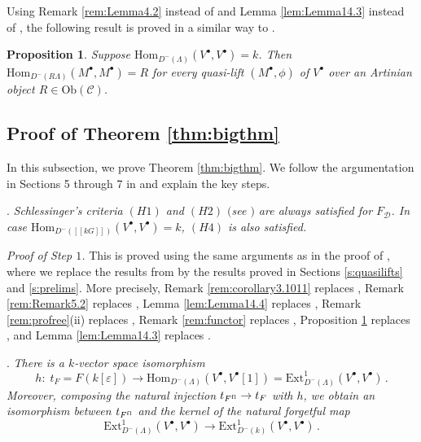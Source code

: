 \documentclass{amsart}
\theoremstyle{plain}
\newtheorem{prop}[thm]{Proposition}
\theoremstyle{definition}
\theoremstyle{remark}
\begin{document}
Using Remark \ref{rem:Lemma4.2} instead of \cite[Lemma 4.2]{bcderived} and
Lemma \ref{lem:Lemma14.3} instead of \cite[Lemma 14.3]{bcderived}, the following result 
is proved in a similar way to
\cite[Prop. 4.3]{bcderived}.

\begin{prop}
\label{prop:liftendos}
Suppose $\mathrm{Hom}_{D^-(\Lambda)}(V^\bullet,V^\bullet)= k$.
Then $\mathrm{Hom}_{D^-(R\Lambda)}(M^\bullet,M^\bullet)= R$
for every quasi-lift $(M^\bullet,\phi)$ of $V^\bullet$ over an Artinian object 
$R\in\mathrm{Ob}(\mathcal{C})$.
\end{prop}

\subsection{Proof of Theorem \ref{thm:bigthm}}
\label{s:proofbigthm}

In this subsection, we prove Theorem \ref{thm:bigthm}. We follow the argumentation in
Sections 5 through 7 in \cite{bcderived} and explain the key steps.

\medskip

. \textit{Schlessinger's criteria $(H1)$ and $(H2)$
$($see \cite[Thm. 2.11]{Sch}$)$
are always satisfied for $F_{\mathcal{D}}$. In case
$\mathrm{Hom}_{D^-([[kG]])}(V^\bullet,V^\bullet)= k$,
$(H4)$ is also satisfied.}

\medskip

\noindent\textit{Proof of Step $1$.} This is proved using the same arguments as in the proof of \cite[Prop. 5.1]{bcderived},
where we replace the results from \cite[Sects. 3, 4 and 14]{bcderived} by the results proved in Sections
\ref{s:quasilifts} and \ref{s:prelims}. More precisely, 
Remark \ref{rem:corollary3.1011} replaces \cite[Cor. 3.10]{bcderived},
Remark \ref{rem:Remark5.2} replaces \cite[Remark 5.2]{bcderived},
Lemma \ref{lem:Lemma14.4} replaces \cite[Lemma 14.4]{bcderived},
Remark \ref{rem:profree}(ii) replaces \cite[Lemma 2.11]{bcderived},
Remark \ref{rem:functor} replaces \cite[Prop. 2.12]{bcderived},
Proposition \ref{prop:liftendos} replaces \cite[Prop. 4.3]{bcderived}, and
Lemma \ref{lem:Lemma14.3} replaces \cite[Lemma 14.3]{bcderived}.

\medskip

. \textit{There is a $k$-vector space isomorphism 
$$h: \;t_F = F(k[\varepsilon]) \longrightarrow \mathrm{Hom}_{D^-(\Lambda)}(V^\bullet,V^\bullet[1])=
\mathrm{Ext}^1_{D^-(\Lambda)}(V^\bullet, V^\bullet)\,.$$
Moreover, composing the natural injection $t_{F^{\mathrm{f\/l}}}\to t_F$ with $h$, we obtain an isomorphism between 
$t_{F^{\mathrm{f\/l}}}$ and the kernel of the natural forgetful map
\begin{equation}
\label{eq:forget}
\mathrm{Ext}^1_{D^-(\Lambda)}(V^\bullet,V^\bullet)
\to \mathrm{Ext}^1_{D^-(k)}(V^\bullet,V^\bullet)\,.
\end{equation}}
\end{document}
